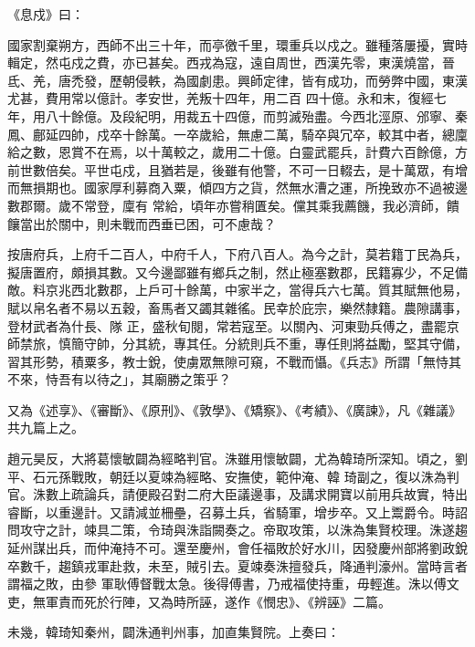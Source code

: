 \begin{pinyinscope}
 《息戍》曰：



 國家割棄朔方，西師不出三十年，而亭徼千里，環重兵以戍之。雖種落屢擾，實時輯定，然屯戍之費，亦已甚矣。西戎為寇，遠自周世，西漢先零，東漢燒當，晉氐、羌，唐禿發，歷朝侵軼，為國劇患。興師定律，皆有成功，而勞弊中國，東漢尤甚，費用常以億計。孝安世，羌叛十四年，用二百
 四十億。永和末，復經七年，用八十餘億。及段紀明，用裁五十四億，而剪滅殆盡。今西北涇原、邠寧、秦鳳、鄜延四帥，戍卒十餘萬。一卒歲給，無慮二萬，騎卒與冗卒，較其中者，總廩給之數，恩賞不在焉，以十萬較之，歲用二十億。白靈武罷兵，計費六百餘億，方前世數倍矣。平世屯戍，且猶若是，後雖有他警，不可一日輟去，是十萬眾，有增而無損期也。國家厚利募商入粟，傾四方之貨，然無水漕之運，所挽致亦不過被邊數郡爾。歲不常登，廩有
 常給，頃年亦嘗稍匱矣。儻其乘我薦饑，我必濟師，饋饟當出於關中，則未戰而西垂已困，可不慮哉？



 按唐府兵，上府千二百人，中府千人，下府八百人。為今之計，莫若籍丁民為兵，擬唐置府，頗損其數。又今邊鄙雖有鄉兵之制，然止極塞數郡，民籍寡少，不足備敵。料京兆西北數郡，上戶可十餘萬，中家半之，當得兵六七萬。質其賦無他易，賦以帛名者不易以五穀，畜馬者又蠲其雜徭。民幸於庇宗，樂然隸籍。農隙講事，登材武者為什長、隊
 正，盛秋旬閱，常若寇至。以關內、河東勁兵傅之，盡罷京師禁旅，慎簡守帥，分其統，專其任。分統則兵不重，專任則將益勵，堅其守備，習其形勢，積粟多，教士銳，使虜眾無隙可窺，不戰而懾。《兵志》所謂「無恃其不來，恃吾有以待之」，其廟勝之策乎？



 又為《述享》、《審斷》、《原刑》、《敦學》、《矯察》、《考績》、《廣諫》，凡《雜議》共九篇上之。



 趙元昊反，大將葛懷敏闢為經略判官。洙雖用懷敏闢，尤為韓琦所深知。頃之，劉平、石元孫戰敗，朝廷以夏竦為經略、安撫使，範仲淹、韓
 琦副之，復以洙為判官。洙數上疏論兵，請便殿召對二府大臣議邊事，及講求開寶以前用兵故實，特出睿斷，以重邊計。又請減並柵壘，召募土兵，省騎軍，增步卒。又上鬻爵令。時詔問攻守之計，竦具二策，令琦與洙詣闕奏之。帝取攻策，以洙為集賢校理。洙遂趨延州謀出兵，而仲淹持不可。還至慶州，會任福敗於好水川，因發慶州部將劉政銳卒數千，趨鎮戎軍赴救，未至，賊引去。夏竦奏洙擅發兵，降通判濠州。當時言者謂福之敗，由參
 軍耿傅督戰太急。後得傅書，乃戒福使持重，毋輕進。洙以傅文吏，無軍責而死於行陣，又為時所誣，遂作《憫忠》、《辨誣》二篇。



 未幾，韓琦知秦州，闢洙通判州事，加直集賢院。上奏曰：




\end{pinyinscope}
